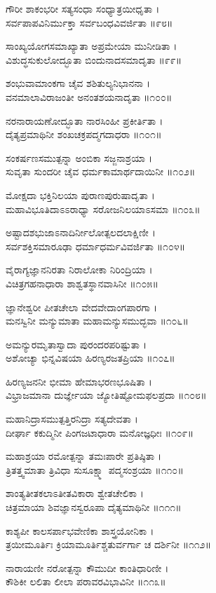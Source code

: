 ಗೌರೀ ಶಾಕಂಭರೀ ಸತ್ಯಸಂಧಾ ಸಂಧ್ಯಾತ್ರಯೀಧೃತಾ ।\\
ಸರ್ವಪಾಪವಿನಿರ್ಮುಕ್ತಾ ಸರ್ವಬಂಧವಿವರ್ಜಿತಾ ॥೯೮॥

ಸಾಂಖ್ಯಯೋಗಸಮಾಖ್ಯಾತಾ ಅಪ್ರಮೇಯಾ ಮುನೀಡಿತಾ ।\\
ವಿಶುದ್ಧಸುಕುಲೋದ್ಭೂತಾ ಬಿಂದುನಾದಸಮಾದೃತಾ ॥೯೯॥

ಶಂಭುವಾಮಾಂಕಗಾ ಚೈವ ಶಶಿತುಲ್ಯನಿಭಾನನಾ ।\\
ವನಮಾಲಾವಿರಾಜಂತೀ ಅನಂತಶಯನಾದೃತಾ ॥೧೦೦॥

ನರನಾರಾಯಣೋದ್ಭೂತಾ ನಾರಸಿಂಹೀ ಪ್ರಕೀರ್ತಿತಾ ।\\
ದೈತ್ಯಪ್ರಮಾಥಿನೀ ಶಂಖಚಕ್ರಪದ್ಮಗದಾಧರಾ ॥೧೦೧॥

ಸಂಕರ್ಷಣಸಮುತ್ಪನ್ನಾ ಅಂಬಿಕಾ ಸಜ್ಜನಾಶ್ರಯಾ ।\\
ಸುವೃತಾ ಸುಂದರೀ ಚೈವ ಧರ್ಮಕಾಮಾರ್ಥದಾಯಿನೀ ॥೧೦೨॥

ಮೋಕ್ಷದಾ ಭಕ್ತಿನಿಲಯಾ ಪುರಾಣಪುರುಷಾದೃತಾ ।\\
ಮಹಾವಿಭೂತಿದಾಽಽರಾಧ್ಯಾ ಸರೋಜನಿಲಯಾಽಸಮಾ ॥೧೦೩॥

ಅಷ್ಟಾದಶಭುಜಾಽನಾದಿರ್ನೀಲೋತ್ಪಲದಲಾಕ್ಷಿಣೀ ।\\
ಸರ್ವಶಕ್ತಿಸಮಾರೂಢಾ ಧರ್ಮಾಧರ್ಮವಿವರ್ಜಿತಾ ॥೧೦೪॥

ವೈರಾಗ್ಯಜ್ಞಾನನಿರತಾ ನಿರಾಲೋಕಾ ನಿರಿಂದ್ರಿಯಾ ।\\
ವಿಚಿತ್ರಗಹನಾಧಾರಾ ಶಾಶ್ವತಸ್ಥಾನವಾಸಿನೀ ॥೧೦೫॥

ಜ್ಞಾನೇಶ್ವರೀ ಪೀತಚೇಲಾ ವೇದವೇದಾಂಗಪಾರಗಾ ।\\
ಮನಸ್ವಿನೀ ಮನ್ಯುಮಾತಾ ಮಹಾಮನ್ಯುಸಮುದ್ಭವಾ ॥೧೦೬॥

ಅಮನ್ಯುರಮೃತಾಸ್ವಾದಾ ಪುರಂದರಪರಿಷ್ಟುತಾ ।\\
ಅಶೋಚ್ಯಾ ಭಿನ್ನವಿಷಯಾ ಹಿರಣ್ಯರಜತಪ್ರಿಯಾ ॥೧೦೭॥

ಹಿರಣ್ಯಜನನೀ ಭೀಮಾ ಹೇಮಾಭರಣಭೂಷಿತಾ ।\\
ವಿಭ್ರಾಜಮಾನಾ ದುರ್ಜ್ಞೇಯಾ ಜ್ಯೋತಿಷ್ಟೋಮಫಲಪ್ರದಾ ॥೧೦೮॥

ಮಹಾನಿದ್ರಾಸಮುತ್ಪತ್ತಿರನಿದ್ರಾ ಸತ್ಯದೇವತಾ ।\\
ದೀರ್ಘಾ ಕಕುದ್ಮಿನೀ ಪಿಂಗಜಟಾಧಾರಾ ಮನೋಜ್ಞಧೀಃ ॥೧೦೯॥

ಮಹಾಶ್ರಯಾ ರಮೋತ್ಪನ್ನಾ ತಮಃಪಾರೇ ಪ್ರತಿಷ್ಠಿತಾ ।\\
ತ್ರಿತತ್ತ್ವಮಾತಾ ತ್ರಿವಿಧಾ ಸುಸೂಕ್ಷ್ಮಾ ಪದ್ಮಸಂಶ್ರಯಾ ॥೧೧೦॥

ಶಾಂತ್ಯತೀತಕಲಾಽತೀತವಿಕಾರಾ ಶ್ವೇತಚೇಲಿಕಾ ।\\
ಚಿತ್ರಮಾಯಾ ಶಿವಜ್ಞಾನಸ್ವರೂಪಾ ದೈತ್ಯಮಾಥಿನೀ ॥೧೧೧॥

ಕಾಶ್ಯಪೀ ಕಾಲಸರ್ಪಾಭವೇಣಿಕಾ ಶಾಸ್ತ್ರಯೋನಿಕಾ ।\\
ತ್ರಯೀಮೂರ್ತಿಃ ಕ್ರಿಯಾಮೂರ್ತಿಶ್ಚತುರ್ವರ್ಗಾ ಚ ದರ್ಶಿನೀ ॥೧೧೨॥

ನಾರಾಯಣೀ ನರೋತ್ಪನ್ನಾ ಕೌಮುದೀ ಕಾಂತಿಧಾರಿಣೀ ।\\
ಕೌಶಿಕೀ ಲಲಿತಾ ಲೀಲಾ ಪರಾವರವಿಭಾವಿನೀ ॥೧೧೩॥

